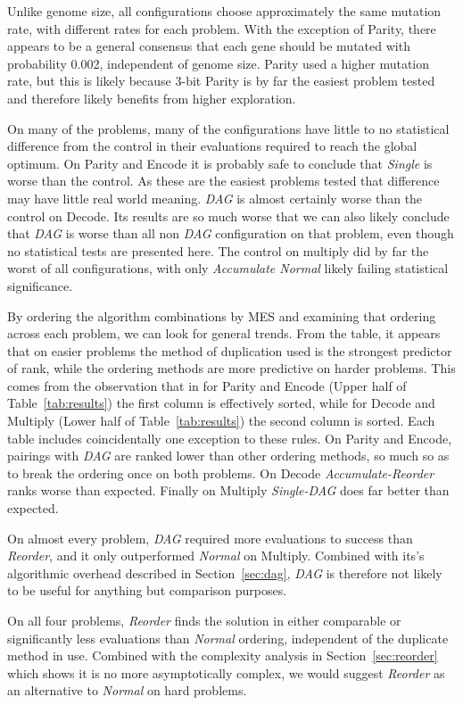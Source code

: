 \documentclass[journal]{IEEEtran}
\begin{document}
Unlike genome size, all configurations choose approximately the same mutation rate,
with different rates for each problem.  With the exception of Parity, there appears
to be a general consensus that each gene should be mutated with probability 0.002,
independent of genome size.  Parity used a higher mutation rate, but this is likely
because 3-bit Parity is by far the easiest problem tested and therefore likely benefits
from higher exploration.

On many of the problems, many of the configurations have little to no statistical
difference from the control in their evaluations required to reach the global optimum.
On Parity and Encode it is probably safe to conclude that \emph{Single} is worse than
the control.  As these are the easiest problems tested that difference may have
little real world meaning.  \emph{DAG} is almost certainly worse than the control on
Decode.  Its results are so much worse that we can also likely conclude that \emph{DAG}
is worse than all non \emph{DAG} configuration on that problem, even though no statistical
tests are presented here.  The control on multiply did by far the worst of all configurations,
with only \emph{Accumulate Normal} likely failing statistical significance.

By ordering the algorithm combinations by MES and examining that ordering across each
problem, we can look for general trends.  From the table, it appears that on easier problems
the method of duplication used is the strongest predictor of rank, while
the ordering methods are more predictive on harder problems.  This comes from the
observation that in for Parity and Encode (Upper half of Table~\ref{tab:results})
the first column is effectively sorted, while for Decode and Multiply
(Lower half of Table~\ref{tab:results})
the second column is sorted.
Each table includes coincidentally one exception to these rules.  On Parity and
Encode, pairings with \emph{DAG} are ranked lower than other ordering methods, so much
so as to break the ordering once on both problems.  On Decode \emph{Accumulate-Reorder}
ranks worse than expected.  Finally on Multiply \emph{Single-DAG} does far better
than expected.

On almost every problem, \emph{DAG} required
more evaluations to success than \emph{Reorder}, and it only outperformed \emph{Normal}
on Multiply.  Combined with its's algorithmic overhead described in
Section~\ref{sec:dag}, \emph{DAG} is therefore not likely to be useful for anything
but comparison purposes.

On all four problems, \emph{Reorder} finds the solution in either comparable
or significantly less evaluations than \emph{Normal} ordering, independent of
the duplicate method in use.  Combined with the complexity analysis in
Section~\ref{sec:reorder} which shows it is no more asymptotically complex,
we would suggest \emph{Reorder} as an alternative to \emph{Normal} on hard
problems.
\end{document}
